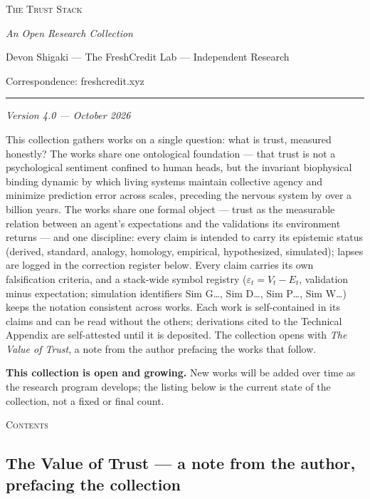 \documentclass[11pt]{article}
\renewcommand{\maketitle}{%
  \begin{center}
    {\LARGE\scshape The Trust Stack\par}
    \vspace{0.7em}
    {\large\itshape An Open Research Collection\par}
    \vspace{1.0em}
    {\normalsize Devon Shigaki --- The FreshCredit Lab --- Independent Research\par}
    \vspace{0.2em}
    {\normalsize Correspondence: freshcredit.xyz\par}
    \vspace{0.8em}
    {\rule{0.32\textwidth}{0.4pt}\par}
  \end{center}
  \vspace{1.0em}
}
\begin{document}
\maketitle
\begin{center}\small\itshape Version 4.0 --- October 2026\end{center}
\thispagestyle{empty}

\noindent This collection gathers works on a single question: what is trust,
measured honestly? The works share one ontological foundation --- that trust
is not a psychological sentiment confined to human heads, but the invariant
biophysical binding dynamic by which living systems maintain collective agency
and minimize prediction error across scales, preceding the nervous system by over
a billion years. The works share one formal object --- trust as the measurable
relation between an agent's expectations and the validations its environment
returns --- and one discipline: every claim is intended to carry its epistemic
status (derived, standard, analogy, homology, empirical, hypothesized,
simulated); lapses are logged in the correction register below. Every claim
carries its own falsification criteria, and a stack-wide symbol
registry ($\varepsilon_t = V_t - E_t$, validation minus expectation; simulation
identifiers Sim G\ldots, Sim D\ldots, Sim P\ldots, Sim W\ldots) keeps the
notation consistent across works. Each work is self-contained in its claims and can be read without the others; derivations cited to the Technical Appendix are self-attested until it is deposited. The collection opens with \emph{The Value of Trust}, a note from the
author prefacing the works that follow.

\noindent\textbf{This collection is open and growing.} New works will be added
over time as the research program develops; the listing below is the current
state of the collection, not a fixed or final count.

\vspace{0.6em}
\begin{center}{\large\scshape Contents}\end{center}
\vspace{0.2em}

\subsection*{\texorpdfstring{The Value of Trust --- a note from the author, prefacing the collection}{The Value of Trust -- a note from the author, prefacing the collection}}
\end{document}
